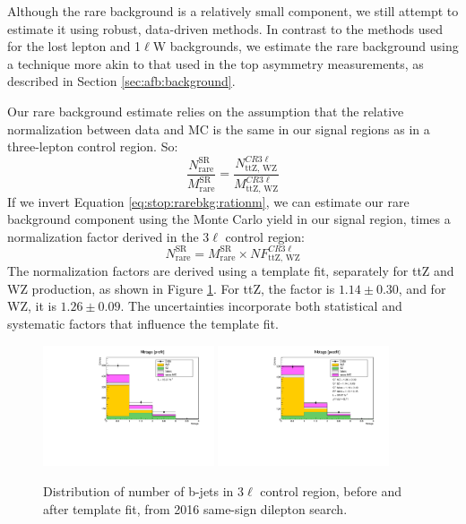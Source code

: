 Although the rare background is a relatively small component, we still
attempt to estimate it using robust, data-driven methods. In contrast
to the methods used for the lost lepton and 1$\ell$W backgrounds, we
estimate the rare background using a technique more akin to that used
in the top asymmetry measurements, as described in Section
\ref{sec:afb:background}.

Our rare background estimate relies on the assumption that the relative
normalization between data and MC is the same in our signal regions as
in a three-lepton control region. So:
\begin{equation}
\label{eq:stop:rarebkg:rationm}
\frac{N_\text{rare}^\text{SR}}{M_\text{rare}^\text{SR}} =
\frac{N_\text{ttZ, WZ}^{CR3\ell}}{M_\text{ttZ, WZ}^{CR3\ell}}
\end{equation}
If we invert Equation \ref{eq:stop:rarebkg:rationm}, we can estimate
our rare background component using the Monte Carlo yield in our
signal region, times a normalization factor derived in the 3$\ell$
control region:
\begin{equation}
\label{eq:stop:rarebkg:estimation}
N_\text{rare}^\text{SR} = M_\text{rare}^\text{SR} \times
NF_\text{ttZ, WZ}^{CR 3\ell}
\end{equation}
The normalization factors are derived using a template fit, separately
for ttZ and WZ production, as shown in Figure
\ref{fig:stop:rarebkg:normalization}. For ttZ, the factor is $1.14 \pm
0.30$, and for WZ, it is $1.26 \pm 0.09$. The uncertainties
incorporate both statistical and systematic factors that influence the
template fit.

\begin{figure}[htb]
\centering
\includegraphics[width=0.45\textwidth]{figures/rarebkg_norm_prefit.pdf}
\includegraphics[width=0.45\textwidth]{figures/rarebkg_norm_postfit.pdf}
\caption{Distribution of number of b-jets in 3$\ell$ control region,
  before and after template fit, from 2016 same-sign dilepton search.}
\label{fig:stop:rarebkg:normalization}
\end{figure}

